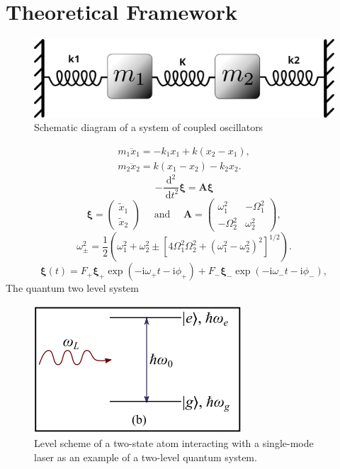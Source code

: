 \section{Theoretical Framework}
\begin{figure}[H]
	\centering
	\includegraphics[scale=0.3]{coupled1.png}
	\caption{Schematic diagram of a system of coupled oscillators}
	\label{fig:mb-fe-0}
\end{figure}
$$ \begin{array}{l}m_{1} \ddot{x}_{1}=-k_{1} x_{1}+k\left(x_{2}-x_{1}\right), \\ m_{2} \ddot{x}_{2}=k\left(x_{1}-x_{2}\right)-k_{2} x_{2} .\end{array}$$
$$-\frac{\mathrm{d}^{2}}{\mathrm{~d} t^{2}} \boldsymbol{\xi}=\mathbf{A} \boldsymbol{\xi}$$
$$ \boldsymbol{\xi}=\left(\begin{array}{l}\tilde{x}_{1} \\\tilde{x}_{2}\end{array}\right) \quad \text { and } \quad \mathbf{A}=\left(\begin{array}{cc}\omega_{1}^{2} & -\Omega_{1}^{2} \\-\Omega_{2}^{2} & \omega_{2}^{2}\end{array}\right),$$
$$\omega_{ \pm}^{2}=\frac{1}{2}\left(\omega_{1}^{2}+\omega_{2}^{2} \pm\left[4 \Omega_{1}^{2} \Omega_{2}^{2}+\left(\omega_{1}^{2}-\omega_{2}^{2}\right)^{2}\right]^{1 / 2}\right) .$$
$$
\boldsymbol{\xi}(t)=F_{+} \boldsymbol{\xi}_{+} \exp \left(-\mathrm{i} \omega_{+} t-\mathrm{i} \phi_{+}\right)+F_{-} \boldsymbol{\xi}_{-} \exp \left(-\mathrm{i} \omega_{-} t-\mathrm{i} \phi_{-}\right),$$
The quantum two level system\\
\begin{figure}[H]
	\centering
	\includegraphics[scale=1]{two level.png}
	\caption{Level scheme of
		a two-state atom interacting with a single-mode laser as an example of a two-level
		quantum system.}
	\label{fig:mb-fe-0}
\end{figure}

